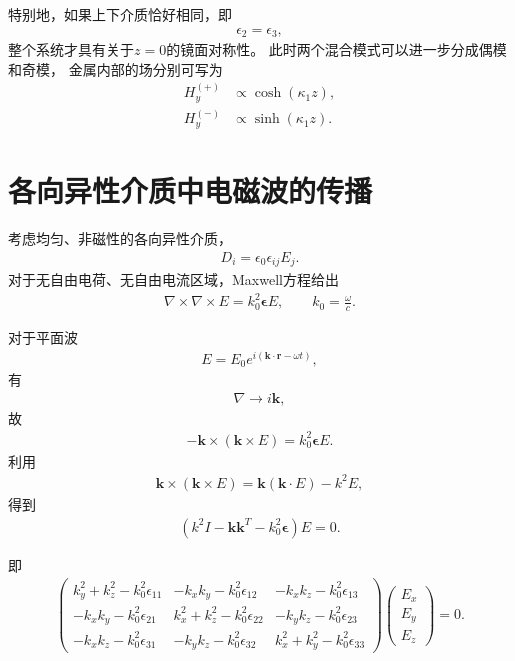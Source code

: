 \documentclass{article}
\begin{document}
特别地，如果上下介质恰好相同，即
\begin{align}
    \epsilon_2=\epsilon_3,
\end{align}
整个系统才具有关于$z=0$的镜面对称性。
此时两个混合模式可以进一步分成偶模和奇模，
金属内部的场分别可写为
\begin{align}
    H_y^{(+)}
    &\propto
    \cosh(\kappa_1z),
\\
    H_y^{(-)}
    &\propto
    \sinh(\kappa_1z).
\end{align}
\section{各向异性介质中电磁波的传播}

考虑均匀、非磁性的各向异性介质，
\begin{align}
    D_i=\epsilon_0\epsilon_{ij}E_j.
\end{align}
对于无自由电荷、无自由电流区域，Maxwell方程给出
\begin{align}
    \nabla\times\nabla\times E
    =
    k_0^2\boldsymbol{\epsilon}E,
    \qquad
    k_0=\frac{\omega}{c}.
\end{align}

对于平面波
\begin{align}
    E=E_0e^{i(\mathbf k\cdot\mathbf r-\omega t)},
\end{align}
有
\begin{align}
    \nabla\rightarrow i\mathbf k,
\end{align}
故
\begin{align}
    -\mathbf k\times(\mathbf k\times E)
    =
    k_0^2\boldsymbol{\epsilon}E.
\end{align}
利用
\begin{align}
    \mathbf k\times(\mathbf k\times E)
    =
    \mathbf k(\mathbf k\cdot E)-k^2E,
\end{align}
得到
\begin{align}
    \left(
    k^2I-\mathbf k\mathbf k^{T}
    -k_0^2\boldsymbol{\epsilon}
    \right)E=0.
\end{align}

即
\begin{align}
\begin{pmatrix}
k_y^2+k_z^2-k_0^2\epsilon_{11}
&
-k_xk_y-k_0^2\epsilon_{12}
&
-k_xk_z-k_0^2\epsilon_{13}
\\
-k_xk_y-k_0^2\epsilon_{21}
&
k_x^2+k_z^2-k_0^2\epsilon_{22}
&
-k_yk_z-k_0^2\epsilon_{23}
\\
-k_xk_z-k_0^2\epsilon_{31}
&
-k_yk_z-k_0^2\epsilon_{32}
&
k_x^2+k_y^2-k_0^2\epsilon_{33}
\end{pmatrix}
\begin{pmatrix}
E_x\\
E_y\\
E_z
\end{pmatrix}
=0.
\end{align}
\end{document}
